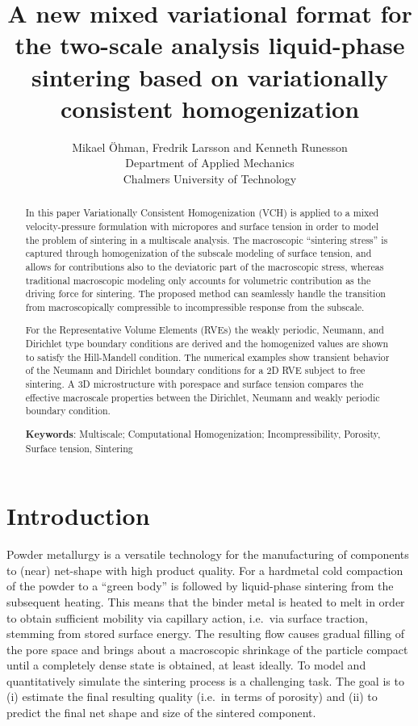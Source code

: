 \documentclass[12pt,a4paper]{article}
\title{A new mixed variational format for the two-scale analysis liquid-phase sintering based on variationally consistent homogenization}
\author{
Mikael Öhman, Fredrik Larsson and Kenneth Runesson\\
Department of Applied Mechanics \\
Chalmers University of Technology}
\begin{document}
\maketitle
\begin{abstract}
In this paper Variationally Consistent Homogenization (VCH) is applied to a mixed velocity-pressure formulation with micropores and surface tension in order to model the problem of sintering in a multiscale analysis.
The macroscopic ``sintering stress'' is captured through homogenization of the subscale modeling of surface tension, and allows for contributions also to the deviatoric part of the macroscopic stress, whereas traditional macroscopic modeling only accounts for volumetric contribution as the driving force for sintering.
The proposed method can seamlessly handle the transition from macroscopically compressible to incompressible response from the subscale.

For the Representative Volume Elements (RVEs) the weakly periodic, Neumann, and Dirichlet type boundary conditions are derived and the homogenized values are shown to satisfy the Hill-Mandell condition.
The numerical examples show transient behavior of the Neumann and Dirichlet boundary conditions for a 2D RVE subject to free sintering.
A 3D microstructure with porespace and surface tension compares the effective macroscale properties between the Dirichlet, Neumann and weakly periodic boundary condition.


\textbf{Keywords}:
Multiscale; Computational Homogenization; Incompressibility, Porosity, Surface tension, Sintering
\end{abstract}

\section{Introduction}
Powder metallurgy is a versatile technology for the manufacturing of components to (near) net-shape with high product quality.
For a hardmetal cold compaction of the powder to a ``green body'' is followed by liquid-phase sintering from the subsequent heating.
This means that the binder metal is heated to melt in order to obtain sufficient mobility via capillary action, i.e.\ via surface traction, stemming from stored surface energy.
The resulting flow causes gradual filling of the pore space and brings about a macroscopic shrinkage of the particle compact until a completely dense state is obtained, at least ideally.
To model and quantitatively simulate the sintering process is a challenging task.
The goal is to (i) estimate the final resulting quality (i.e.\ in terms of porosity) and (ii) to predict the final net shape and size of the sintered component.
\end{document}
